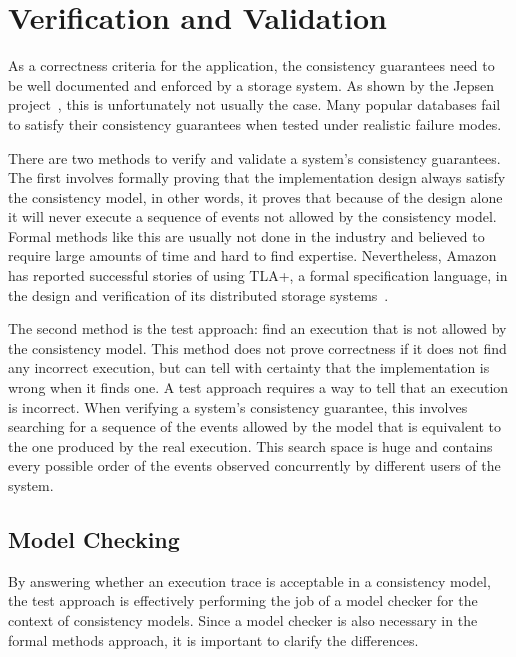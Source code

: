 \documentclass[12pt,conference]{IEEEtran}
\begin{document}
\section{Verification and Validation}

As a correctness criteria for the application, the consistency guarantees need to be well documented and enforced by a storage system. As shown by the Jepsen project~\cite{jepsenWebsite,jepsenGithubWebsite}, this is unfortunately not usually the case. Many popular databases fail to satisfy their consistency guarantees when tested under realistic failure modes.

There are two methods to verify and validate a system's consistency guarantees. The first involves formally proving that the implementation design always satisfy the consistency model, in other words, it proves that because of the design alone it will never execute a sequence of events not allowed by the consistency model. Formal methods like this are usually not done in the industry and believed to require large amounts of time and hard to find expertise. Nevertheless, Amazon has reported successful stories of using TLA+, a formal specification language, in the design and verification of its distributed storage systems~\cite{newcombe2014use}.

The second method is the test approach: find an execution that is not allowed by the consistency model. This method does not prove correctness if it does not find any incorrect execution, but can tell with certainty that the implementation is wrong when it finds one. A test approach requires a way to tell that an execution is incorrect. When verifying a system's consistency guarantee, this involves searching for a sequence of the events allowed by the model that is equivalent to the one produced by the real execution. This search space is huge and contains every possible order of the events observed concurrently by different users of the system. 

\subsection{Model Checking}

By answering whether an execution trace is acceptable in a consistency model, the test approach is effectively performing the job of a model checker for the context of consistency models. Since a model checker is also necessary in the formal methods approach, it is important to clarify the differences. 
\end{document}

